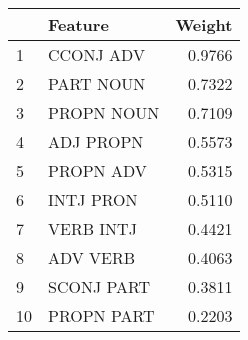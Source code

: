 \begin{tabular}{llr}
\toprule
{} &     Feature &  Weight \\
\midrule
1  &   CCONJ ADV &  0.9766 \\
2  &   PART NOUN &  0.7322 \\
3  &  PROPN NOUN &  0.7109 \\
4  &   ADJ PROPN &  0.5573 \\
5  &   PROPN ADV &  0.5315 \\
6  &   INTJ PRON &  0.5110 \\
7  &   VERB INTJ &  0.4421 \\
8  &    ADV VERB &  0.4063 \\
9  &  SCONJ PART &  0.3811 \\
10 &  PROPN PART &  0.2203 \\
\bottomrule
\end{tabular}
